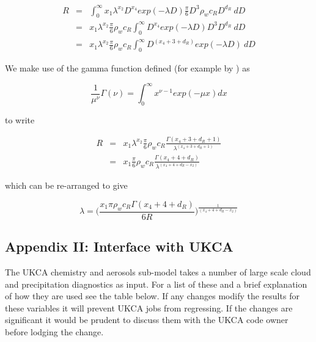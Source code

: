 \documentclass{UMDP_article}
\begin{document}
\begin{eqnarray}
R&=&\int_{0}^{\infty} x_{1} \lambda^{x_{2}} D^{x_{4}} exp(- \lambda D) \frac{\pi}{6} D^{3} \rho_{w} c_{R} D^{d_{R}} \ dD \nonumber \\ 
&=& x_{1} \lambda^{x_{2}} \frac{\pi}{6} \rho_{w} c_{R} \int_{0}^{\infty}  D^{x_{4}} exp(- \lambda D) D^{3} D^{d_{R}} \ dD \nonumber \\
&=& x_{1} \lambda^{x_{2}} \frac{\pi}{6} \rho_{w} c_{R} \int_{0}^{\infty}  D^{(x_{4}+3+d_{R})} exp(- \lambda D) \ dD
\end{eqnarray}

We make use of the gamma function defined (for example by \cite{dz84}) as 

\begin{equation}
\frac{1}{\mu^{\nu}}\Gamma(\nu)=\int_{0}^{\infty} x^{\nu-1} exp(-\mu x) dx
\end{equation}

to write

\begin{eqnarray}
R&=&x_{1} \lambda^{x_{2}} \frac{\pi}{6} \rho_{w} c_{R} 
\frac{\Gamma(x_{4}+3+d_{R}+1)}{\lambda^{(x_{4}+3+d_{R}+1)}} \nonumber \\
&=&x_{1} \frac{\pi}{6} \rho_{w} c_{R} \frac{\Gamma(x_{4}+4+d_{R})}{\lambda^{(x_{4}+4+d_{R}-x_{2})}}
\end{eqnarray}

which can be re-arranged to give

\begin{equation}
\lambda=\Big ( \frac{x_{1} \pi \rho_{w} c_{R} \Gamma(x_{4}+4+d_{R})}{6 R} \Big )^{\frac{1}{(x_{4}+4+d_{R}-x_{2})}}
\label{eqn:lambda}
\end{equation}

\clearpage
{}
{}
\subsection*{Appendix II: Interface with UKCA}
The UKCA chemistry and aerosols sub-model takes a number of large scale cloud 
and precipitation diagnostics as input. For a list of these and a brief
explanation of how they are used see the table below.
If any changes modify the results for these variables it will 
prevent UKCA jobs from regressing. If the changes are significant
it would be prudent to discuss them with the UKCA code owner before lodging
the change.
\end{document}
